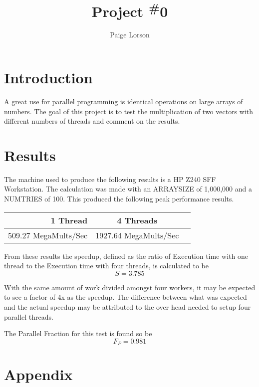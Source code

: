 \documentclass{article}
\title{\textbf{ Project \textsuperscript \#0}}
\author{Paige Lorson}
\begin{document}
\maketitle{}
\section*{Introduction}
\quad A great use for parallel programming is identical operations on large arrays of numbers. The goal of this project is to test the multiplication of two vectors with different numbers of threads and comment on the results.

\section*{Results}
\quad The machine used to produce the following results is a HP Z240 SFF Workstation.
The calculation was made with an ARRAYSIZE of 1,000,000 and a NUMTRIES of 100. This produced the following peak performance results.

\begin{center}
\begin{tabular}{r  |cl}
1 Thread   & 4 Threads\\
\hline
509.27 MegaMults/Sec & 1927.64 MegaMults/Sec
\end{tabular}
\end{center}

From these results the speedup, defined as the ratio of Execution time with one thread to the Execution time with four threads, is calculated to be
$$S = 3.785 $$

With the same amount of work divided amongst four workers, it may be expected to see a factor of 4x as the speedup. The difference between what was expected and the actual speedup may be attributed to the over head needed to setup four parallel threads.

The Parallel Fraction for this test is found so be
$$F_P =  0.981$$
\newpage
\section*{Appendix}
\end{document}
